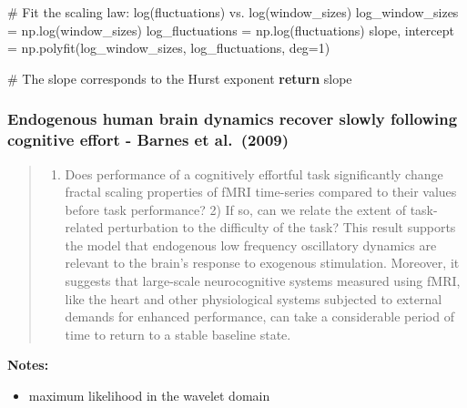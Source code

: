 \documentclass[
  sn-vancouver,
  Numbered,
  referee,
  lineno]{sn-jnl}
\newenvironment{Shaded}{\begin{snugshade}}{\end{snugshade}}
\newcommand{\CommentTok}[1]{\textcolor[rgb]{0.37,0.37,0.37}{#1}}
\newcommand{\ControlFlowTok}[1]{\textcolor[rgb]{0.00,0.23,0.31}{\textbf{#1}}}
\newcommand{\DecValTok}[1]{\textcolor[rgb]{0.68,0.00,0.00}{#1}}
\newcommand{\NormalTok}[1]{\textcolor[rgb]{0.00,0.23,0.31}{#1}}
\newcommand{\OperatorTok}[1]{\textcolor[rgb]{0.37,0.37,0.37}{#1}}
\providecommand{\tightlist}{%
  \setlength{\itemsep}{0pt}\setlength{\parskip}{0pt}}\usepackage{longtable,booktabs,array}
\begin{document}
\begin{Shaded}
\begin{Highlighting}[]
    \CommentTok{\# Fit the scaling law: log(fluctuations) vs. log(window\_sizes)}
\NormalTok{    log\_window\_sizes }\OperatorTok{=}\NormalTok{ np.log(window\_sizes)}
\NormalTok{    log\_fluctuations }\OperatorTok{=}\NormalTok{ np.log(fluctuations)}
\NormalTok{    slope, intercept }\OperatorTok{=}\NormalTok{ np.polyfit(log\_window\_sizes, log\_fluctuations, deg}\OperatorTok{=}\DecValTok{1}\NormalTok{)}
    
    \CommentTok{\# The slope corresponds to the Hurst exponent}
    \ControlFlowTok{return}\NormalTok{ slope}
\end{Highlighting}
\end{Shaded}

\subsubsection{\texorpdfstring{Endogenous human brain dynamics recover
slowly following cognitive effort - Barnes et al.~(2009)
\citep{barnesEndogenousHumanBrain2009}}{Endogenous human brain dynamics recover slowly following cognitive effort - Barnes et al.~(2009) {[}@barnesEndogenousHumanBrain2009{]}}}\label{endogenous-human-brain-dynamics-recover-slowly-following-cognitive-effort---barnes-et-al.-2009-barnesendogenoushumanbrain2009}

\begin{quote}
\begin{enumerate}
\def\labelenumi{\arabic{enumi})}
\tightlist
\item
  Does performance of a cognitively effortful task significantly change
  fractal scaling properties of fMRI time-series compared to their
  values before task performance? 2) If so, can we relate the extent of
  task-related perturbation to the difficulty of the task? This result
  supports the model that endogenous low frequency oscillatory dynamics
  are relevant to the brain's response to exogenous stimulation.
  Moreover, it suggests that large-scale neurocognitive systems measured
  using fMRI, like the heart and other physiological systems subjected
  to external demands for enhanced performance, can take a considerable
  period of time to return to a stable baseline state.
\end{enumerate}
\end{quote}

\textbf{Notes:}

\begin{itemize}
\tightlist
\item
  maximum likelihood in the wavelet domain
\end{itemize}
\end{document}
